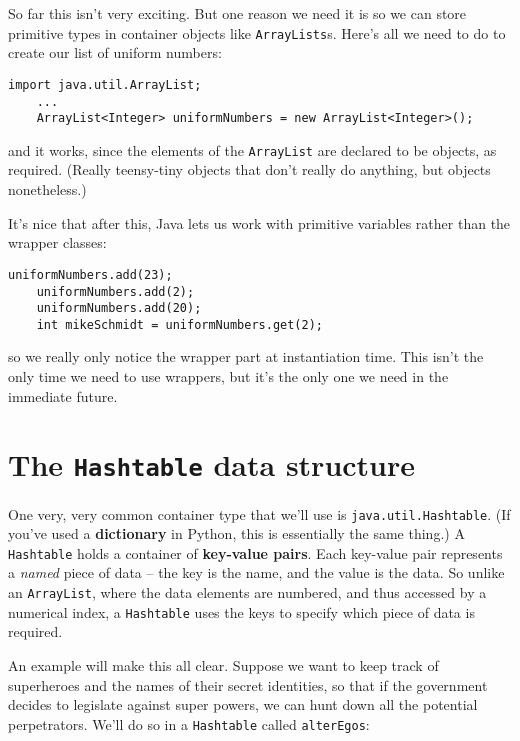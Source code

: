 So far this isn't very exciting. But one reason we need it is so we can store
primitive types in container objects like \texttt{ArrayLists}s. Here's all we
need to do to create our list of uniform numbers:

\begin{Verbatim}[fontsize=\small,samepage=true]
    import java.util.ArrayList;
    ...
    ArrayList<Integer> uniformNumbers = new ArrayList<Integer>();
\end{Verbatim}

and it works, since the elements of the \texttt{ArrayList} are declared to be
objects, as required. (Really teensy-tiny objects that don't really do
anything, but objects nonetheless.)

It's nice that after this, Java lets us work with primitive variables rather
than the wrapper classes:

\begin{Verbatim}[fontsize=\small,samepage=true]
    uniformNumbers.add(23);
    uniformNumbers.add(2);
    uniformNumbers.add(20);
    int mikeSchmidt = uniformNumbers.get(2);
\end{Verbatim}

so we really only notice the wrapper part at instantiation time. This isn't
the only time we need to use wrappers, but it's the only one we need in the
immediate future.

\section{The \texttt{Hashtable} data structure}

One very, very common container type that we'll use is
\texttt{java.util.Hashtable}. (If you've used a \textbf{dictionary} in Python,
this is essentially the same thing.) A \texttt{Hashtable} holds a container of
\textbf{key-value pairs}. Each key-value pair represents a \textit{named}
piece of data -- the key is the name, and the value is the data. So unlike an
\texttt{ArrayList}, where the data elements are numbered, and thus accessed by
a numerical index, a \texttt{Hashtable} uses the keys to specify which piece
of data is required.

An example will make this all clear. Suppose we want to keep track of
superheroes and the names of their secret identities, so that if the
government decides to legislate against super powers, we can hunt down all the
potential perpetrators. We'll do so in a \texttt{Hashtable} called
\texttt{alterEgos}:

